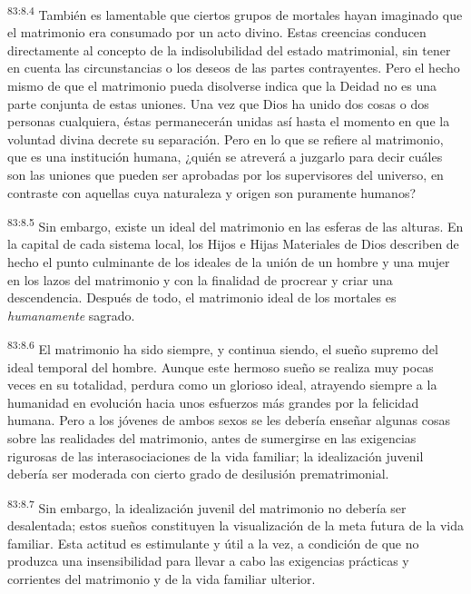 \documentclass[twoside, 11pt]{book}
\begin{document}
\par
\textsuperscript{83:8.4} También es lamentable que ciertos grupos de mortales hayan imaginado que el matrimonio era consumado por un acto divino. Estas creencias conducen directamente al concepto de la indisolubilidad del estado matrimonial, sin tener en cuenta las circunstancias o los deseos de las partes contrayentes. Pero el hecho mismo de que el matrimonio pueda disolverse indica que la Deidad no es una parte conjunta de estas uniones. Una vez que Dios ha unido dos cosas o dos personas cualquiera, éstas permanecerán unidas así hasta el momento en que la voluntad divina decrete su separación. Pero en lo que se refiere al matrimonio, que es una institución humana, ¿quién se atreverá a juzgarlo para decir cuáles son las uniones que pueden ser aprobadas por los supervisores del universo, en contraste con aquellas cuya naturaleza y origen son puramente humanos?

\par
\textsuperscript{83:8.5} Sin embargo, existe un ideal del matrimonio en las esferas de las alturas. En la capital de cada sistema local, los Hijos e Hijas Materiales de Dios describen de hecho el punto culminante de los ideales de la unión de un hombre y una mujer en los lazos del matrimonio y con la finalidad de procrear y criar una descendencia. Después de todo, el matrimonio ideal de los mortales es \textit{humanamente} sagrado.

\par
\textsuperscript{83:8.6} El matrimonio ha sido siempre, y continua siendo, el sueño supremo del ideal temporal del hombre. Aunque este hermoso sueño se realiza muy pocas veces en su totalidad, perdura como un glorioso ideal, atrayendo siempre a la humanidad en evolución hacia unos esfuerzos más grandes por la felicidad humana. Pero a los jóvenes de ambos sexos se les debería enseñar algunas cosas sobre las realidades del matrimonio, antes de sumergirse en las exigencias rigurosas de las interasociaciones de la vida familiar; la idealización juvenil debería ser moderada con cierto grado de desilusión prematrimonial.

\par
\textsuperscript{83:8.7} Sin embargo, la idealización juvenil del matrimonio no debería ser desalentada; estos sueños constituyen la visualización de la meta futura de la vida familiar. Esta actitud es estimulante y útil a la vez, a condición de que no produzca una insensibilidad para llevar a cabo las exigencias prácticas y corrientes del matrimonio y de la vida familiar ulterior.
\end{document}

